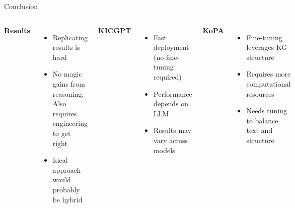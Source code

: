 \documentclass[aspectratio=169,xcolor=dvipsnames]{beamer}
\begin{document}


\begin{frame}{Conclusion}

    \begin{columns}[t]
        \textbf{Results}
        \begin{itemize}
            \item Replicating results is hard
            \item No magic gains from reasoning:
            Also requires engineering to get right
            \item Ideal approach would probably be hybrid
        \end{itemize}

        \textbf{KICGPT}
        \begin{itemize}
            \item Fast deployment (no fine-tuning required)
            \item Performance depends on LLM
            \item Results may vary across models
        \end{itemize}
        \textbf{KoPA}
        \begin{itemize}
            \item Fine-tuning leverages KG structure
            \item Requires more computational resources
            \item Needs tuning to balance text and structure
        \end{itemize}
    \end{columns}
    \vspace{4mm}
    \begin{center}
    \end{center}
\end{frame}
\end{document}
